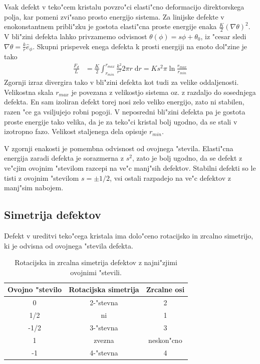 \documentclass[a4paper,10pt]{article}
\newcommand{\dd}{\ensuremath{\;\mathrm{d}}}
\begin{document}
Vsak defekt v teko"cem kristalu povzro"ci elasti"cno deformacijo direktorskega polja, kar pomeni zvi"sano prosto energijo sistema. 
Za linijske defekte v enokonstantnem pribli"zku je gostota elasti"cna proste energije enaka $\frac{K}{2}(\nabla \theta)^2$. 
V bli"zini defekta lahko privzamemo odvisnost $\theta(\phi) = s \phi + \theta_0$, iz "cesar sledi $\nabla\theta = \frac{k}{r}\hat e_\phi$. 
Skupni prispevek enega defekta k prosti energiji na enoto dol"zine je tako\cite{degennes}
\begin{align}
 \frac{F_d}{L} &= \frac{K}{2} \int_{r_{min}}^{r_{max}} \frac{k^2}{r^2} 2\pi r \dd r = K s^2 \pi \ln{\frac{r_{max}}{r_{min}}}
\end{align}
Zgornji izraz divergira tako v bli"zini defekta kot tudi za velike oddaljenosti. 
Velikostna skala $r_{max}$ je povezana z velikostjo sistema oz. z razdaljo do sosednjega defekta. 
En sam izoliran defekt torej nosi zelo veliko energijo, zato ni stabilen, razen "ce ga vsiljujejo robni pogoji. 
V neposredni bli"zini defekta pa je gostota proste energije tako velika, da je za teko"ci kristal bolj ugodno, da se stali v izotropno fazo. 
Velikost staljenega dela opisuje $r_{min}$. 

V zgornji enakosti je pomembna odvisnost od ovojnega "stevila. 
Elasti"cna energija zaradi defekta je sorazmerna z $s^2$, zato je bolj ugodno, da se defekt z ve"cjim ovojnim "stevilom razcepi na ve"c manj"sih defektov. 
Stabilni defekti so le tisti z ovojnim "stevilom $s=\pm1/2$, vsi ostali razpadejo na ve"c defektov z manj"sim nabojem. 

\subsection{Simetrija defektov}
Defekt v ureditvi teko"cega kristala ima dolo"ceno rotacijsko in zrcalno simetrijo, ki je odvisna od ovojnega "stevila defekta. 

\begin{table}[h]
 \centering
 \begin{tabular}{|c|c|c|}
 \hline
  Ovojno "stevilo & Rotacijska simetrija & Zrcalne osi \\
  \hline
  0 & 2-"stevna & 2 \\
  1/2 & ni & 1 \\
  -1/2 & 3-"stevna & 3 \\
  1 & zvezna & neskon"cno \\
  -1 & 4-"stevna & 4 \\
  \hline
 \end{tabular}
\caption{Rotacijska in zrcalna simetrija defektov z najni"zjimi ovojnimi "stevili. }
\label{tab:simetrija}
\end{table}
\end{document}
